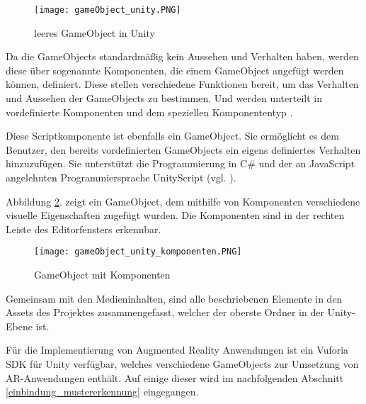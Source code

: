 \begin{figure} [h]
\centering
\texttt{[image: gameObject\_unity.PNG]}
\caption{leeres GameObject in Unity \cite{Tuplier2014}}
\label{fig:gameObject_unity}
\end{figure}

Da die GameObjects standardmäßig kein Aussehen und Verhalten haben, werden diese über sogenannte Komponenten, die einem GameObject angefügt werden können, definiert.
Diese stellen verschiedene Funktionen bereit, um das Verhalten und Aussehen der GameObjects zu bestimmen. 
Und werden unterteilt in vordefinierte Komponenten und dem speziellen Komponententyp .

Diese Scriptkomponente ist ebenfalls ein GameObject. Sie ermöglicht es dem Benutzer, den bereits vordefinierten GameObjects ein eigens definiertes Verhalten hinzuzufügen. 
Sie unterstützt die Programmierung in C\# und der an JavaScript angelehnten Programmiersprache UnityScript (vgl. \cite{Geiger2014}).

Abbildung \ref{fig:gameObject_unity_komponenten}. zeigt ein GameObject, dem mithilfe von Komponenten verschiedene visuelle Eigenschaften zugefügt wurden. Die Komponenten sind in der rechten Leiste des Editorfensters erkennbar.

\begin{figure} [h]
\centering
\texttt{[image: gameObject\_unity\_komponenten.PNG]}
\caption{GameObject mit Komponenten \cite{Tuplier2014}}
\label{fig:gameObject_unity_komponenten}
\end{figure}

Gemeinsam mit den Medieninhalten, sind alle beschriebenen Elemente in den Assets des Projektes zusammengefasst, welcher der oberste Ordner in der Unity-Ebene ist.

Für die Implementierung von Augmented Reality Anwendungen ist ein Vuforia SDK für Unity verfügbar, welches verschiedene GameObjects zur Umsetzung von AR-Anwendungen enthält. Auf einige dieser wird im nachfolgenden Abschnitt \ref{einbindung_mustererkennung} eingegangen.